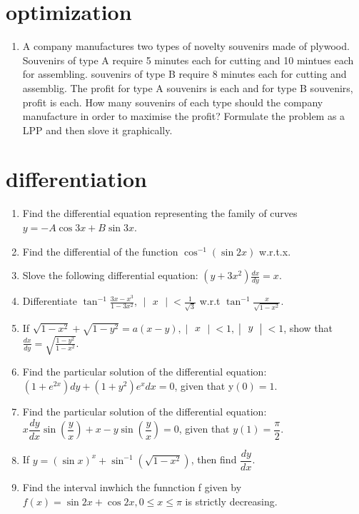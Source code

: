 \documentclass{article}
\providecommand{\brak}[1]{\ensuremath{\left(#1\right)}}
\newcommand{\mydet}[1]{\ensuremath{\begin{vmatrix}#1\end{vmatrix}}}
\begin{document}
\section{optimization}
\begin{enumerate}
\item A company manufactures two types of novelty souvenirs made of plywood. Souvenirs of type A require 5 minutes each for cutting and 10 mintues each for assembling. souvenirs of type B require 8 minutes each for cutting and assemblig. The profit for type A souvenirs is   each and for type B souvenirs, profit is   each. How many souvenirs of each type should the company manufacture in order to maximise the profit? Formulate the problem as a LPP and then slove it graphically.
\end{enumerate}
\section{differentiation}
\begin{enumerate}
\item Find the differential equation representing the family of curves $y=-A\cos3x+B\sin3x$.
\item Find the differential of the function $\cos^{-1}\brak{\sin2x}$ w.r.t.x.
\item Slove the following differential equation: 
		$\brak{y+3x^{2}}\frac{dx}{dy}=x$.
\item Differentiate $\tan^{-1}\frac{3x-x^{3}}{1-3x^{2}}$, $\mydet{x}<\frac{1}{\sqrt{3}}$ w.r.t $\tan^{-1}\frac{x}{\sqrt{1-x^{2}}}$.
\item If $\sqrt{1-x^{2}}+\sqrt{1-y^{2}}=a\brak{x-y}, \mydet{x}<1, \mydet{y}<1$, show that $\frac{dx}{dy}=\sqrt{\frac{1-y^{2}}{1-x^{2}}}$.
\item Find the particular solution of the differential equation:
	$\brak{1+e^{2x}}dy+\brak{1+y^{2}}e^{x}dx=0$, given that y$\brak{0}=1$.
\item Find the particular solution of the differential equation:
	$x\dfrac{dy}{dx}\sin \brak{\dfrac{y}{x}}+x-y\sin\brak{\dfrac{y}{x}}=0$, given that $y\brak{1}=\dfrac{\pi}{2}$.
\item If $y=\brak{\sin x}^{x}+\sin^{-1}\brak{\sqrt{1-x^{2}}}$, then find $\dfrac{dy}{dx}$.
\item Find the interval inwhich the funnction f given by $f\brak{x}=\sin 2x+\cos 2x, 0\leq x\leq \pi$ is strictly decreasing.
\end{enumerate}
\end{document}
